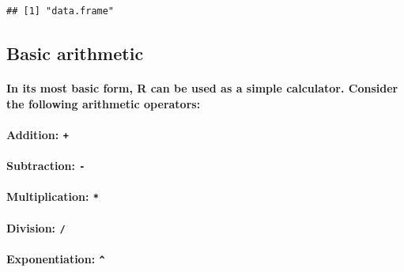 \documentclass[
]{article}
\let\oldparagraph\paragraph
\renewcommand{\paragraph}[1]{\oldparagraph{#1}\mbox{}}
\begin{document}
\begin{verbatim}
## [1] "data.frame"
\end{verbatim}

\hypertarget{basic-arithmetic}{%
\subsection{Basic arithmetic}\label{basic-arithmetic}}

\hypertarget{in-its-most-basic-form-r-can-be-used-as-a-simple-calculator.-consider-the-following-arithmetic-operators}{%
\paragraph{In its most basic form, R can be used as a simple calculator.
Consider the following arithmetic
operators:}\label{in-its-most-basic-form-r-can-be-used-as-a-simple-calculator.-consider-the-following-arithmetic-operators}}

\hypertarget{addition}{%
\paragraph{\texorpdfstring{\textbf{Addition}:
\texttt{+}}{Addition: +}}\label{addition}}

\hypertarget{subtraction--}{%
\paragraph{\texorpdfstring{\textbf{Subtraction}:
\texttt{-}}{Subtraction: -}}\label{subtraction--}}

\hypertarget{multiplication}{%
\paragraph{\texorpdfstring{\textbf{Multiplication}:
\texttt{*}}{Multiplication: *}}\label{multiplication}}

\hypertarget{division}{%
\paragraph{\texorpdfstring{\textbf{Division}:
\texttt{/}}{Division: /}}\label{division}}

\hypertarget{exponentiation}{%
\paragraph{\texorpdfstring{\textbf{Exponentiation}:
\texttt{\^{}}}{Exponentiation: \^{}}}\label{exponentiation}}
\end{document}
